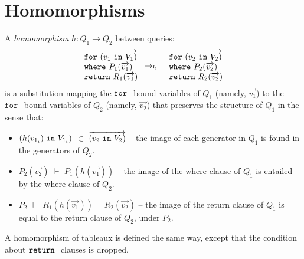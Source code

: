 \documentclass[preprint]{sigplanconf}
\newcommand{\FOR}{{\tt for}\relax\ifmmode\ \else\xspace\fi}
\newcommand{\WHERE}{{\tt where}\relax\ifmmode\ \else\xspace\fi}
\newcommand{\IN}{ \ {\tt in} \ }
\newcommand{\RETURN}{{\tt return}\relax\ifmmode\ \else\xspace\fi}
\begin{document}
\section{Homomorphisms}

A {\it homomorphism} $h : Q_1 \to Q_2$ between queries:
\begin{eqnarray*}
\begin{array}{l}
\FOR \overrightarrow{(v_1 \IN V_1)} \\
\WHERE P_1(\overrightarrow{v_1}) \\
\RETURN R_1(\overrightarrow{v_1})
\end{array} & \to_h &
\begin{array}{l}
\FOR \overrightarrow{(v_2 \IN V_2)} \\
\WHERE P_2(\overrightarrow{v_2}) \\
\RETURN R_2(\overrightarrow{v_2})
\end{array}
\end{eqnarray*}
is a substitution mapping the $\FOR$-bound variables of $Q_1$ (namely, $
\overrightarrow{v_1}$) to the $\FOR$-bound variables of $Q_2$ (namely, $
\overrightarrow{v_2}$) that preserves the structure of $Q_1$ in the sense that:
\begin{itemize}
\item  
 $(h(v_{1_i}) \IN V_{1_i})$ $ \in$ $\overrightarrow{(v_2 \IN V_2)}$ -- the image of each generator in $Q_1$ is found in the generators of $Q_2$. 

\item $P_2(\overrightarrow{v_2})$ $\vdash$ $P_1(h(\overrightarrow{v_1}))$ -- the image of the where clause of $Q_1$ is entailed by the where clause of $Q_2$.

\item $P_2$ $\vdash$ $R_1(h(\overrightarrow{v_1})) = R_2(\overrightarrow{v_2})$ -- the image of the return clause of $Q_1$ is equal to the return clause of $Q_2$, under $P_2$.
\end{itemize}
A homomorphism of tableaux is defined the same way, except that the condition about $\RETURN$ clauses is dropped.  
\end{document}

